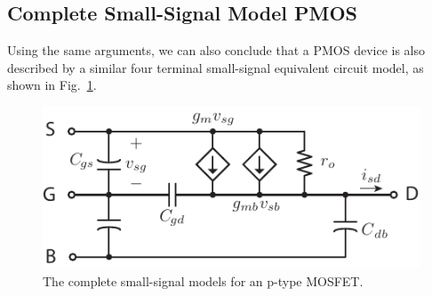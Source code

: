 \subsection{Complete Small-Signal Model PMOS}
Using the same arguments, we can also conclude that a PMOS device is also described by a similar four terminal small-signal equivalent circuit model, as shown in Fig.~\ref{fig:pmos4term_ac}.
\begin{figure}[h]
\begin{center}
\includegraphics[scale=1]{pmos4term_ac}
\end{center}
\caption{The complete small-signal models for an p-type MOSFET.}
\label{fig:pmos4term_ac}
\end{figure}
